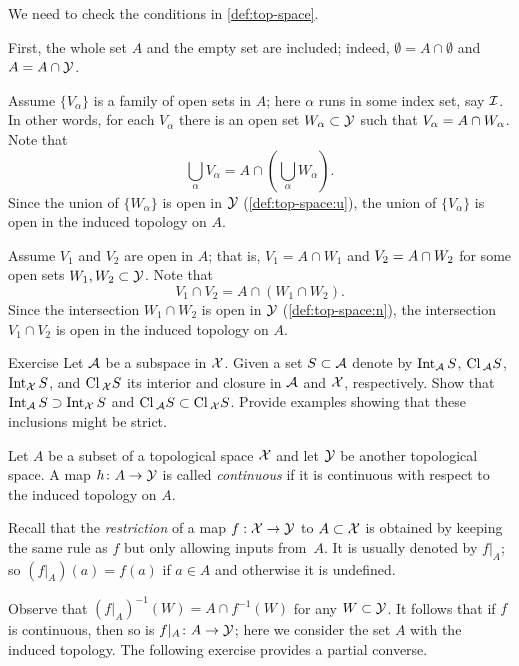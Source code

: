 We need to check the conditions in \ref{def:top-space}.

First, the whole set $A$ and the empty set are included;
indeed, $\emptyset=A\cap \emptyset$ and $A=A\cap \mathcal{Y}$.

Assume $\{V_\alpha\}$ is a family of open sets in $A$; here $\alpha$ runs in some index set, say $\mathcal{I}$.
In other words, for each $V_\alpha$ there is an open set $W_\alpha\subset\mathcal{Y}$ such that $V_\alpha\z=A\cap W_\alpha$.
Note that
\[\bigcup_\alpha V_\alpha=A\cap\left(\bigcup_\alpha W_\alpha\right).\]
Since the union of $\{W_\alpha\}$ is open in $\mathcal{Y}$ (\ref{def:top-space:u}), the union of $\{V_\alpha\}$ is open in the induced topology on $A$.

Assume $V_1$ and $V_2$ are open in $A$;
that is, $V_1=A\cap W_1$ and  $V_2\z=A\cap W_2$ for some open sets $W_1,W_2\subset\mathcal{Y}$.
Note that
\[V_1\cap V_2=A\cap(W_1\cap W_2).\]
Since the intersection $W_1\cap W_2$ is open in $\mathcal{Y}$ (\ref{def:top-space:n}),
the intersection $V_1\cap V_2$ is open in the induced topology on $A$.
\qeds

\begin{thm}{Exercise}\label{ex:rel-int/cl}
Let $\mathcal{A}$ be a subspace in $\mathcal{X}$.
Given a set $S\subset \mathcal{A}$ denote by $\mathop{\rm Int}\nolimits_{\mathcal{A}}S$, $\mathrm{Cl\,}_{\mathcal{A}}S$, $\mathop{\rm Int}\nolimits_{\mathcal{X}}S$, and $\mathrm{Cl\,}_{\mathcal{X}}S$ its interior and closure in $\mathcal{A}$ and $\mathcal{X}$, respectively.
Show that
$\mathop{\rm Int}\nolimits_{\mathcal{A}}S\supset \mathop{\rm Int}\nolimits_{\mathcal{X}}S$ and $\mathrm{Cl\,}_{\mathcal{A}}S\subset \mathrm{Cl\,}_{\mathcal{X}}S$.
Provide examples showing that these inclusions might be strict.
\end{thm}

Let $A$ be a subset of a topological space $\mathcal{X}$ and let $\mathcal{Y}$ be another topological space.
A map $h\colon A\to \mathcal{Y}$ is called \emph{continuous} if it is continuous with respect to the induced topology on $A$.

Recall that the \emph{restriction} of a map $f:\mathcal{X}\to \mathcal{Y}$ to $A\subset\mathcal{X}$ is obtained by keeping the same rule as $f$ but only allowing inputs from~$A$.
It is usually denoted by $f|_A$; so $(f|_A)(a)=f(a)$ if $a\in A$ and otherwise it is undefined.

Observe that $(f|_A)^{-1}(W)=A\cap f^{-1}(W)$ for any $W\subset \mathcal{Y}$.
It follows that if $f$ is continuous, then so is $f|_A\colon A\to\mathcal{Y}$;
here we consider the set $A$ with the induced topology.
The following exercise provides a partial converse.

